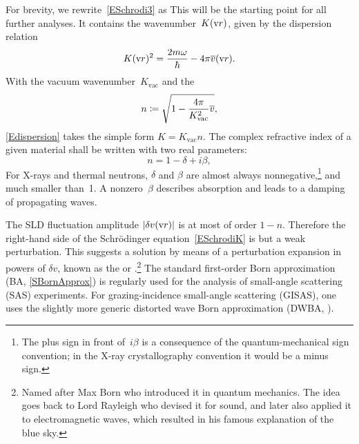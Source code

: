 For brevity, we rewrite~\cref{ESchrodi3} as
This will be the starting point for all further analyses.
It contains the wavenumber~$K(\text{v}{r})$, given by the dispersion relation
%
%
%
\begin{equation}\label{Edispersion}
  K(\text{v}{r})^2 = \frac{2m\omega}{\hbar} - 4\pi\overline{v}(\text{v}{r}).
\end{equation}
With the vacuum wavenumber~$K_\text{vac}$
%
and the 
%
%
%
\begin{equation}\label{EnRefrIndx}
  n\coloneqq \sqrt{1-\frac{4\pi}{K_\text{vac}^2}\overline{v}},
\end{equation}
\cref{Edispersion} takes the simple form $K=K_\text{vac} n$.
%
The complex refractive index of a given material
shall be written with two real parameters:
\begin{equation}\label{Endb1}
  n =  1-\delta +i\beta,
\end{equation}
%
%
For X-rays and thermal neutrons,
$\delta$ and $\beta$ are almost always nonnegative,\footnote
{The plus sign in front of~$i\beta$ is a consequence of
the quantum-mechanical sign convention;
in the X-ray crystallography convention it would be a minus sign.
%
}
and much smaller than~1.
A nonzero~$\beta$ describes absorption and leads to a damping of propagating waves.

The SLD fluctuation amplitude $|\delta v(\text{v}{r})|$ is at most of order $1-n$.
Therefore the right-hand side of the Schrödinger equation~\cref{ESchrodiK}
is but a weak perturbation.
This suggests a solution
by means of a perturbation expansion in powers of $\delta v$,
known as the  or .\footnote{
Named after Max Born
who introduced it in quantum mechanics.
The idea goes back to Lord Rayleigh
who devised it for sound,
and later also applied it to electromagnetic waves,
which resulted in his famous explanation of the blue sky.}
The standard first-order Born approximation (BA, \cref{SBornApprox})
is regularly used  for the analysis of small-angle scattering (SAS) experiments.
%
%
%
%
For grazing-incidence small-angle scattering (GISAS),
one uses the slightly more generic distorted wave Born approximation (DWBA, ).
%

